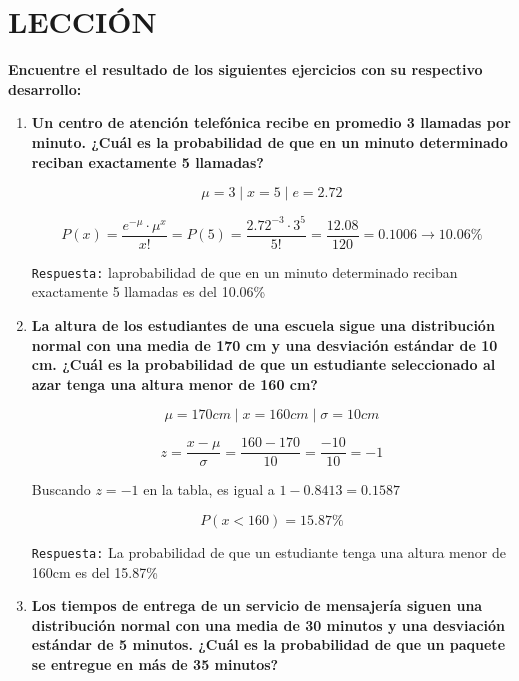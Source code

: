\documentclass[12pt]{article}
\begin{document}
    

    \section*{\centering LECCIÓN} 
    \vspace{0.5cm}\textbf{Encuentre el resultado de los siguientes ejercicios con su respectivo desarrollo:} \vspace{0.5cm}

    \begin{enumerate}[label=\textbf{\arabic*.}]
        \item \textbf{Un centro de atención telefónica recibe en promedio 3 llamadas por minuto. ¿Cuál es la probabilidad de que 
        en un minuto determinado reciban exactamente 5 llamadas?}

        \[\mu = 3 \mid x = 5 \mid e = 2.72\]

        \[P(x) = \frac{e^{-\mu}\cdot \mu^x}{x!} = P(5) = \frac{2.72^{-3}\cdot 3^5}{5!}
            = \frac{12.08}{120} = 0.1006 \longrightarrow 10.06\%
        \]

        \texttt{Respuesta:} laprobabilidad de que en un minuto determinado reciban exactamente 5 llamadas
        es del 10.06\%

        \item \textbf{La altura de los estudiantes de una escuela sigue una distribución normal con una media de 170 cm y una 
        desviación estándar de 10 cm. ¿Cuál es la probabilidad de que un estudiante seleccionado al azar tenga una altura menor de 160 cm?}

        \[\mu = 170cm \mid x = 160cm \mid \sigma = 10cm\]

        \[z = \frac{x - \mu}{\sigma} = \frac{160 - 170}{10} = \frac{-10}{10} = -1\]

        Buscando $z = -1$ en la tabla, es igual a $1 - 0.8413 = 0.1587$

        \[P(x < 160) = 15.87\%\]

        \texttt{Respuesta:} La probabilidad de que un estudiante tenga una altura menor de 160cm es del 15.87\%

        \item \textbf{Los tiempos de entrega de un servicio de mensajería siguen una distribución normal con una media de 30 minutos y 
        una desviación estándar de 5 minutos. ¿Cuál es la probabilidad de que un paquete se entregue en más de 35 minutos?}


\end{enumerate}
\end{document}
